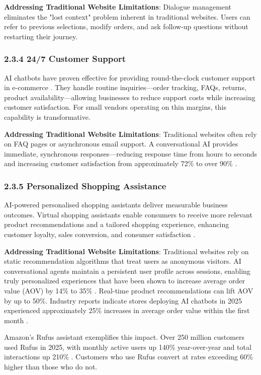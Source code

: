 \documentclass[12pt,a4paper]{article}
\begin{document}
\textbf{Addressing Traditional Website Limitations}: Dialogue management eliminates the "lost context" problem inherent in traditional websites. Users can refer to previous selections, modify orders, and ask follow-up questions without restarting their journey.

\subsubsection{2.3.4 24/7 Customer Support}

AI chatbots have proven effective for providing round-the-clock customer support in e-commerce \citep{chintalapudi2025}. They handle routine inquiries---order tracking, FAQs, returns, product availability---allowing businesses to reduce support costs while increasing customer satisfaction. For small vendors operating on thin margins, this capability is transformative.

\textbf{Addressing Traditional Website Limitations}: Traditional websites often rely on FAQ pages or asynchronous email support. A conversational AI provides immediate, synchronous responses---reducing response time from hours to seconds and increasing customer satisfaction from approximately 72\% to over 90\% \citep{sharma2025}.

\subsubsection{2.3.5 Personalized Shopping Assistance}

AI-powered personalised shopping assistants deliver measurable business outcomes. Virtual shopping assistants enable consumers to receive more relevant product recommendations and a tailored shopping experience, enhancing customer loyalty, sales conversion, and consumer satisfaction \citep{dagtekin2026}.

\textbf{Addressing Traditional Website Limitations}: Traditional websites rely on static recommendation algorithms that treat users as anonymous visitors. AI conversational agents maintain a persistent user profile across sessions, enabling truly personalized experiences that have been shown to increase average order value (AOV) by 14\% to 35\% \citep{forrester2024}. Real-time product recommendations can lift AOV by up to 50\%. Industry reports indicate stores deploying AI chatbots in 2025 experienced approximately 25\% increases in average order value within the first month \citep{gorgias2026}.

Amazon's Rufus assistant exemplifies this impact. Over 250 million customers used Rufus in 2025, with monthly active users up 140\% year-over-year and total interactions up 210\% \citep{amazon2025}. Customers who use Rufus convert at rates exceeding 60\% higher than those who do not.
\end{document}

